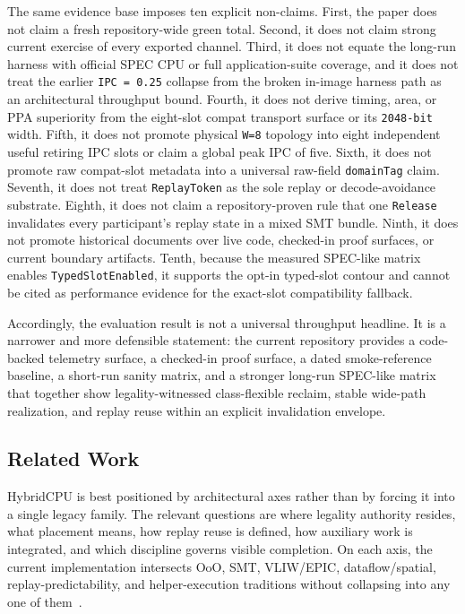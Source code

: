 \documentclass[twocolumn]{article}
\begin{document}
The same evidence base imposes ten explicit non-claims. First, the paper does not claim a fresh repository-wide green total. Second, it does not claim strong current exercise of every exported channel. Third, it does not equate the long-run harness with official SPEC CPU or full application-suite coverage, and it does not treat the earlier \texttt{IPC = 0.25} collapse from the broken in-image harness path as an architectural throughput bound. Fourth, it does not derive timing, area, or PPA superiority from the eight-slot compat transport surface or its \texttt{2048-bit} width. Fifth, it does not promote physical \texttt{W=8} topology into eight independent useful retiring IPC slots or claim a global peak IPC of five. Sixth, it does not promote raw compat-slot metadata into a universal raw-field \texttt{domainTag} claim. Seventh, it does not treat \texttt{ReplayToken} as the sole replay or decode-avoidance substrate. Eighth, it does not claim a repository-proven rule that one \texttt{Release} invalidates every participant's replay state in a mixed SMT bundle. Ninth, it does not promote historical documents over live code, checked-in proof surfaces, or current boundary artifacts. Tenth, because the measured SPEC-like matrix enables \texttt{TypedSlotEnabled}, it supports the opt-in typed-slot contour and cannot be cited as performance evidence for the exact-slot compatibility fallback.

Accordingly, the evaluation result is not a universal throughput headline. It is a narrower and more defensible statement: the current repository provides a code-backed telemetry surface, a checked-in proof surface, a dated smoke-reference baseline, a short-run sanity matrix, and a stronger long-run SPEC-like matrix that together show legality-witnessed class-flexible reclaim, stable wide-path realization, and replay reuse within an explicit invalidation envelope.


\subsection{Related Work}

HybridCPU is best positioned by architectural axes rather than by forcing it into a single legacy family. The relevant questions are where legality authority resides, what placement means, how replay reuse is defined, how auxiliary work is integrated, and which discipline governs visible completion. On each axis, the current implementation intersects OoO, SMT, VLIW/EPIC, dataflow/spatial, replay-predictability, and helper-execution traditions without collapsing into any one of them~\cite{tomasulo1967efficient,tullsen1995smt,fisher1983vliw,schlansker2000epic,sankaralingam2003trips,mutlu2003runahead}.
\end{document}
